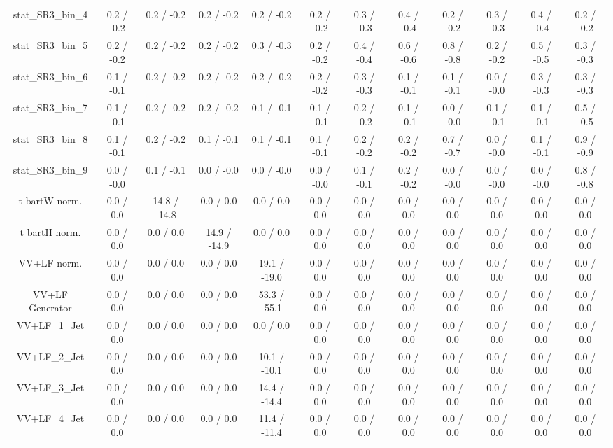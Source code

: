 \begin{table}[htbp]
\begin{center}
\begin{tabular}{|c|c|c|c|c|c|c|c|c|c|c|c|}
 stat_SR3_bin_4 & 0.2 / -0.2 & 0.2 / -0.2 & 0.2 / -0.2 & 0.2 / -0.2 & 0.2 / -0.2 & 0.3 / -0.3 & 0.4 / -0.4 & 0.2 / -0.2 & 0.3 / -0.3 & 0.4 / -0.4 & 0.2 / -0.2 \\ 
 stat_SR3_bin_5 & 0.2 / -0.2 & 0.2 / -0.2 & 0.2 / -0.2 & 0.3 / -0.3 & 0.2 / -0.2 & 0.4 / -0.4 & 0.6 / -0.6 & 0.8 / -0.8 & 0.2 / -0.2 & 0.5 / -0.5 & 0.3 / -0.3 \\ 
 stat_SR3_bin_6 & 0.1 / -0.1 & 0.2 / -0.2 & 0.2 / -0.2 & 0.2 / -0.2 & 0.2 / -0.2 & 0.3 / -0.3 & 0.1 / -0.1 & 0.1 / -0.1 & 0.0 / -0.0 & 0.3 / -0.3 & 0.3 / -0.3 \\ 
 stat_SR3_bin_7 & 0.1 / -0.1 & 0.2 / -0.2 & 0.2 / -0.2 & 0.1 / -0.1 & 0.1 / -0.1 & 0.2 / -0.2 & 0.1 / -0.1 & 0.0 / -0.0 & 0.1 / -0.1 & 0.1 / -0.1 & 0.5 / -0.5 \\ 
 stat_SR3_bin_8 & 0.1 / -0.1 & 0.2 / -0.2 & 0.1 / -0.1 & 0.1 / -0.1 & 0.1 / -0.1 & 0.2 / -0.2 & 0.2 / -0.2 & 0.7 / -0.7 & 0.0 / -0.0 & 0.1 / -0.1 & 0.9 / -0.9 \\ 
 stat_SR3_bin_9 & 0.0 / -0.0 & 0.1 / -0.1 & 0.0 / -0.0 & 0.0 / -0.0 & 0.0 / -0.0 & 0.1 / -0.1 & 0.2 / -0.2 & 0.0 / -0.0 & 0.0 / -0.0 & 0.0 / -0.0 & 0.8 / -0.8 \\ 
  t bar{t}W norm. & 0.0 / 0.0 & 14.8 / -14.8 & 0.0 / 0.0 & 0.0 / 0.0 & 0.0 / 0.0 & 0.0 / 0.0 & 0.0 / 0.0 & 0.0 / 0.0 & 0.0 / 0.0 & 0.0 / 0.0 & 0.0 / 0.0 \\ 
  t bar{t}H norm. & 0.0 / 0.0 & 0.0 / 0.0 & 14.9 / -14.9 & 0.0 / 0.0 & 0.0 / 0.0 & 0.0 / 0.0 & 0.0 / 0.0 & 0.0 / 0.0 & 0.0 / 0.0 & 0.0 / 0.0 & 0.0 / 0.0 \\ 
  VV+LF norm. & 0.0 / 0.0 & 0.0 / 0.0 & 0.0 / 0.0 & 19.1 / -19.0 & 0.0 / 0.0 & 0.0 / 0.0 & 0.0 / 0.0 & 0.0 / 0.0 & 0.0 / 0.0 & 0.0 / 0.0 & 0.0 / 0.0 \\ 
  VV+LF Generator & 0.0 / 0.0 & 0.0 / 0.0 & 0.0 / 0.0 & 53.3 / -55.1 & 0.0 / 0.0 & 0.0 / 0.0 & 0.0 / 0.0 & 0.0 / 0.0 & 0.0 / 0.0 & 0.0 / 0.0 & 0.0 / 0.0 \\ 
  VV+LF_1_Jet & 0.0 / 0.0 & 0.0 / 0.0 & 0.0 / 0.0 & 0.0 / 0.0 & 0.0 / 0.0 & 0.0 / 0.0 & 0.0 / 0.0 & 0.0 / 0.0 & 0.0 / 0.0 & 0.0 / 0.0 & 0.0 / 0.0 \\ 
  VV+LF_2_Jet & 0.0 / 0.0 & 0.0 / 0.0 & 0.0 / 0.0 & 10.1 / -10.1 & 0.0 / 0.0 & 0.0 / 0.0 & 0.0 / 0.0 & 0.0 / 0.0 & 0.0 / 0.0 & 0.0 / 0.0 & 0.0 / 0.0 \\ 
  VV+LF_3_Jet & 0.0 / 0.0 & 0.0 / 0.0 & 0.0 / 0.0 & 14.4 / -14.4 & 0.0 / 0.0 & 0.0 / 0.0 & 0.0 / 0.0 & 0.0 / 0.0 & 0.0 / 0.0 & 0.0 / 0.0 & 0.0 / 0.0 \\ 
  VV+LF_4_Jet & 0.0 / 0.0 & 0.0 / 0.0 & 0.0 / 0.0 & 11.4 / -11.4 & 0.0 / 0.0 & 0.0 / 0.0 & 0.0 / 0.0 & 0.0 / 0.0 & 0.0 / 0.0 & 0.0 / 0.0 & 0.0 / 0.0 \\ 

\end{tabular}
\end{center}
\end{table}
